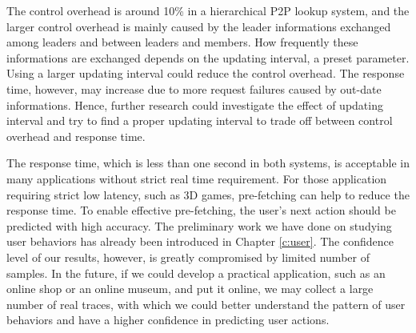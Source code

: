 The control overhead is around 10\% in a hierarchical P2P lookup system, and the larger control overhead is 
mainly caused by the leader informations exchanged among leaders and between leaders and members. 
How frequently these informations are exchanged depends on the updating interval, a preset parameter. 
Using a larger updating interval could reduce the control overhead. 
The response time, however, may increase due to more request failures caused by out-date informations. 
Hence, further research could investigate the effect of updating interval and try to find a proper
updating interval to trade off between control overhead and response time.

The response time, which is less than one second in both systems, is acceptable in many applications without 
strict real time requirement. For those application requiring strict low latency, such
as 3D games, pre-fetching can help to reduce the response time. 
To enable effective pre-fetching, the user's next action should be predicted with high accuracy.
The preliminary work we have done on studying user behaviors has already been introduced in Chapter \ref{c:user}.
The confidence level of our results, however, is greatly compromised by limited number of samples.
In the future, if we could develop a practical application, such as an online shop or an online museum,
and put it online, we may collect a large number of real traces, 
with which we could better understand the pattern of user behaviors and have a higher
confidence in predicting user actions.


